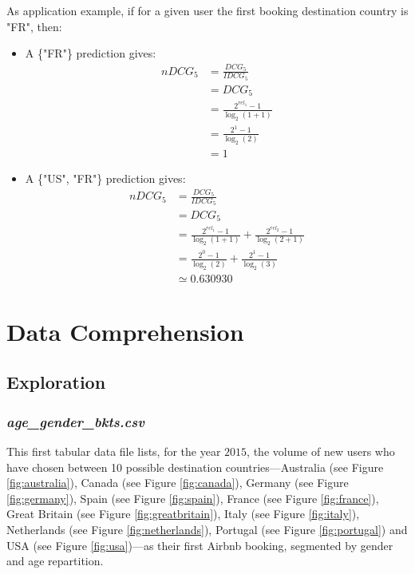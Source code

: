 \documentclass[twocolumn, switch]{article}
\begin{document}
As application example, if for a given user the first booking destination country is "FR", then:
\begin{itemize}
\item A \{"FR"\} prediction gives:
\begin{equation*}
\begin{split}
nDCG_{5} & = \frac{DCG_{5}}{IDCG_{5}} \\
& = DCG_{5} \\
& = \frac{2^{rel_{1}} - 1}{\log_{2}(1 + 1)} \\
& = \frac{2^{1} - 1}{\log_{2}(2)} \\
& = 1
\end{split}
\end{equation*}
\item A \{"US", "FR"\} prediction gives:
\begin{equation*}
\begin{split}
nDCG_{5} & = \frac{DCG_{5}}{IDCG_{5}} \\
& = DCG_{5} \\
& = \frac{2^{rel_{1}} - 1}{\log_{2}(1 + 1)} + \frac{2^{rel_{2}} - 1}{\log_{2}(2 + 1)} \\
& = \frac{2^{0} - 1}{\log_{2}(2)} + \frac{2^{1} - 1}{\log_{2}(3)} \\
& \simeq 0.630930
\end{split}
\end{equation*}
\end{itemize}


\section{Data Comprehension}

\subsection{Exploration}

\subsubsection{\textit{age\_gender\_bkts.csv}}

This first tabular data file lists, for the year $2015$, the volume of new users who have chosen between 10 possible destination countries---Australia (see Figure \ref{fig:australia}), Canada (see Figure \ref{fig:canada}), Germany (see Figure \ref{fig:germany}), Spain (see Figure \ref{fig:spain}), France (see Figure \ref{fig:france}), Great Britain (see Figure \ref{fig:greatbritain}), Italy (see Figure \ref{fig:italy}), Netherlands (see Figure \ref{fig:netherlands}), Portugal (see Figure \ref{fig:portugal}) and USA (see Figure \ref{fig:usa})---as their first Airbnb booking, segmented by gender and age repartition.
\end{document}
